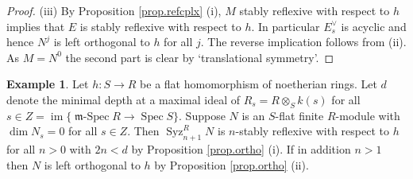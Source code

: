 \documentclass[a4paper,10pt]{amsart}
\theoremstyle{plain}
\theoremstyle{definition}
\newtheorem{ex}[xx]{Example}%
\theoremstyle{remark}
\numberwithin{equation}{xx}
\DeclareMathOperator{\im}{im}
\DeclareMathOperator{\mSpec}{\fr{m}-Spec}
\DeclareMathOperator{\Spec}{Spec}
\DeclareMathOperator{\Syz}{Syz}
\newcommand{\co}{\colon}
\newcommand{\ra}{\rightarrow}
\newcommand{\ot}{{\otimes}}
\newcommand{\fr}[1]{\mathfrak{{#1}}}
\newcommand{\syz}[2]{{\Syz}_{#2}^{#1}}
\begin{document}
\begin{proof}
(iii) By Proposition \ref{prop.refcplx} (i), \(M\) stably reflexive with respect to \(h\) implies that \(E\) is stably reflexive with respect to \(h\). In particular \(E_{s}^{\vee}\) is acyclic and hence \(N^{j}\) is left orthogonal to \(h\) for all \(j\). The reverse implication follows from (ii). As \(M=N^{0}\) the second part is clear by `translational symmetry'.
\end{proof}
\begin{ex}\label{ex.syzref}
Let \(h\co S\ra R\) be a flat homomorphism of noetherian rings. Let \(d\) denote the minimal depth at a maximal ideal of \(R_{s}=R\ot_{S}k(s)\) for all \(s\in Z=\im\{\mSpec R\ra \Spec S\}\). Suppose \(N\) is an \(S\)-flat finite \(R\)-module with \(\dim N_{s}=0\) for all \(s\in Z\). Then \(\syz{R}{n{+}1}N\) is \(n\)-stably reflexive with respect to \(h\) for all \(n>0\) with \(2n<d\) by Proposition \ref{prop.ortho} (i). If in addition \(n>1\) then \(N\) is left orthogonal to \(h\) by Proposition \ref{prop.ortho} (ii).
\end{ex}
\end{document}
